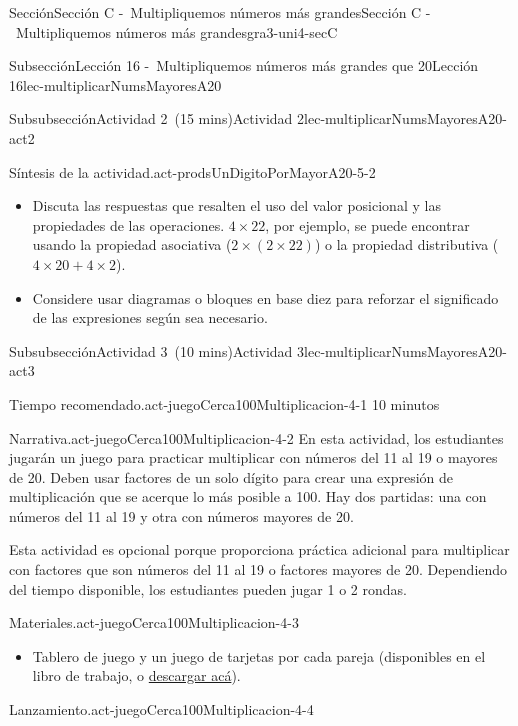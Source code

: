 \documentclass[oneside,10pt,]{article}
\begin{document}
\begin{sectionptx}{Sección}{Sección C -~Multipliquemos números más grandes}{}{Sección C -~Multipliquemos números más grandes}{}{}{gra3-uni4-secC}
\begin{subsectionptx}{Subsección}{Lección 16 -~Multipliquemos números más grandes que 20}{}{Lección 16}{}{}{lec-multiplicarNumsMayoresA20}
\begin{subsubsectionptx}{Subsubsección}{Actividad 2~(15 mins)}{}{Actividad 2}{}{}{lec-multiplicarNumsMayoresA20-act2}
\begin{paragraphs}{Síntesis de la actividad.}{act-prodsUnDigitoPorMayorA20-5-2}
\begin{itemize}[label=\textbullet]
\item{}Discuta las respuestas que resalten el uso del valor posicional y las propiedades de las operaciones. \(4 \times 22\), por ejemplo, se puede encontrar usando la propiedad asociativa (\(2 \times (2 \times 22)\)) o la propiedad distributiva (\(4 \times 20 + 4 \times 2\)).%
\item{}Considere usar diagramas o bloques en base diez para reforzar el significado de las expresiones según sea necesario.%
\end{itemize}
\end{paragraphs}%
\end{subsubsectionptx}
%
%
\typeout{************************************************}
\typeout{************************************************}
%
\begin{subsubsectionptx}{Subsubsección}{Actividad 3~(10 mins)}{}{Actividad 3}{}{}{lec-multiplicarNumsMayoresA20-act3}
\par
\begin{paragraphs}{Tiempo recomendado.}{act-juegoCerca100Multiplicacion-4-1}%
10 minutos%
\end{paragraphs}%
\begin{paragraphs}{Narrativa.}{act-juegoCerca100Multiplicacion-4-2}%
En esta actividad, los estudiantes jugarán un juego para practicar multiplicar con números del 11 al 19 o mayores de 20. Deben usar factores de un solo dígito para crear una expresión de multiplicación que se acerque lo más posible a 100. Hay dos partidas: una con números del 11 al 19 y otra con números mayores de 20.%
\par
Esta actividad es opcional porque proporciona práctica adicional para multiplicar con factores que son números del 11 al 19 o factores mayores de 20. Dependiendo del tiempo disponible, los estudiantes pueden jugar 1 o 2 rondas.%
\end{paragraphs}%
\begin{paragraphs}{Materiales.}{act-juegoCerca100Multiplicacion-4-3}%
%
\begin{itemize}[label=\textbullet]
\item{}Tablero de juego y un juego de tarjetas por cada pareja (disponibles en el libro de trabajo, o \href{external/act-pdf/act-juegoCerca100Multiplicacion.pdf}{descargar acá}\footnotemark{}).%
\end{itemize}
\end{paragraphs}%
\begin{paragraphs}{Lanzamiento.}{act-juegoCerca100Multiplicacion-4-4}%

\end{paragraphs}
\end{subsubsectionptx}
\end{subsectionptx}
\end{sectionptx}
\end{document}

